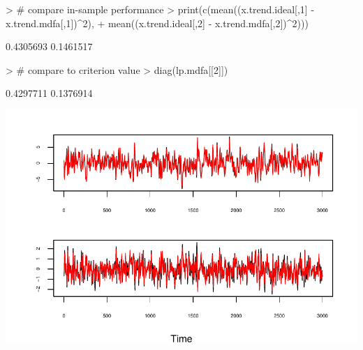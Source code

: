 \documentclass[a4paper]{book}
\begin{document}
\begin{Schunk}
\begin{Sinput}
> # compare in-sample performance
> print(c(mean((x.trend.ideal[,1] - x.trend.mdfa[,1])^2),
+ 	mean((x.trend.ideal[,2] - x.trend.mdfa[,2])^2)))
\end{Sinput}
\begin{Soutput}
[1] 0.4305693 0.1461517
\end{Soutput}
\begin{Sinput}
> # compare to criterion value
> diag(lp.mdfa[[2]])
\end{Sinput}
\begin{Soutput}
[1] 0.4297711 0.1376914
\end{Soutput}
\end{Schunk}

\begin{Schunk}
\begin{Soutput}
\begin{figure}[htb!]
\end{Soutput}
\begin{Soutput}
\begin{center}
\end{Soutput}
\begin{Soutput}
\includegraphics[]{mdfa_var1_filtering.pdf}
\end{Soutput}
\begin{Soutput}
\caption{Ideal trends (black) for the bivariate VAR(1)
	with real-time MDFA trends (red) overlaid, for series one (upper panel)
	and series two (bottom panel).
\end{Soutput}
\begin{Soutput}
\label{fig:var1.trends}}
\end{Soutput}
\begin{Soutput}
\end{center}
\end{Soutput}
\begin{Soutput}
\end{figure}
\end{Soutput}
\end{Schunk}
\end{document}
